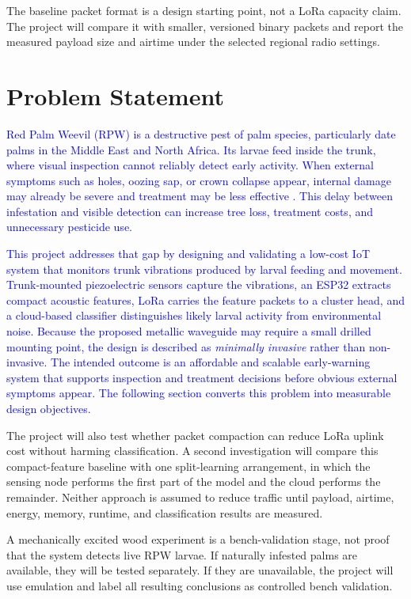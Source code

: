 \documentclass[12pt,a4paper,oneside]{memoir}
\newcommand{\earlierrevision}[1]{\textcolor{blue}{#1}}
\newcommand{\newrevision}[1]{\textcolor{green!45!black}{#1}}
\begin{document}
\newrevision{The baseline packet format is a design starting point, not a LoRa capacity claim. The project will compare it with smaller, versioned binary packets and report the measured payload size and airtime under the selected regional radio settings.}
 
\section{Problem Statement}
\label{sec:Statement}
 
\earlierrevision{Red Palm Weevil (RPW) is a destructive pest of palm species, particularly date palms in the Middle East and North Africa. Its larvae feed inside the trunk, where visual inspection cannot reliably detect early activity. When external symptoms such as holes, oozing sap, or crown collapse appear, internal damage may already be severe and treatment may be less effective \cite{saleem2022,ashry2022cnn}. This delay between infestation and visible detection can increase tree loss, treatment costs, and unnecessary pesticide use.}
 
\earlierrevision{This project addresses that gap by designing and validating a low-cost IoT system that monitors trunk vibrations produced by larval feeding and movement. Trunk-mounted piezoelectric sensors capture the vibrations, an ESP32 extracts compact acoustic features, LoRa carries the feature packets to a cluster head, and a cloud-based classifier distinguishes likely larval activity from environmental noise. Because the proposed metallic waveguide may require a small drilled mounting point, the design is described as \emph{minimally invasive} rather than non-invasive. The intended outcome is an affordable and scalable early-warning system that supports inspection and treatment decisions before obvious external symptoms appear. The following section converts this problem into measurable design objectives.}

\newrevision{The project will also test whether packet compaction can reduce LoRa uplink cost without harming classification. A second investigation will compare this compact-feature baseline with one split-learning arrangement, in which the sensing node performs the first part of the model and the cloud performs the remainder. Neither approach is assumed to reduce traffic until payload, airtime, energy, memory, runtime, and classification results are measured.}

\newrevision{A mechanically excited wood experiment is a bench-validation stage, not proof that the system detects live RPW larvae. If naturally infested palms are available, they will be tested separately. If they are unavailable, the project will use emulation and label all resulting conclusions as controlled bench validation.}
 
\end{document}
